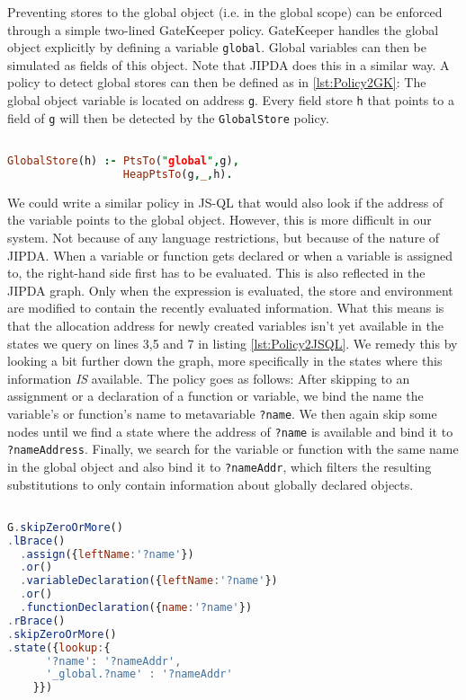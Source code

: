 Preventing stores to the global object (i.e. in the global scope) can be enforced through a simple two-lined GateKeeper policy. GateKeeper handles the global object explicitly by defining a variable \texttt{global}. Global variables can then be simulated as fields of this object. Note that JIPDA does this in a similar way. A policy to detect global stores can then be defined as in \ref{lst:Policy2GK}: The global object variable is located on address \texttt{g}. Every field store \texttt{h} that points to a field of \texttt{g} will then be detected by the \texttt{GlobalStore} policy.

\begin{lstlisting}[label={lst:Policy2GK},language=Prolog,caption=Policy 2 in GateKeeper,mathescape=true]  % float=t?

GlobalStore(h) :- PtsTo("global",g),
                  HeapPtsTo(g,_,h).
\end{lstlisting}

We could write a similar policy in JS-QL that would also look if the address of the variable points to the global object. However, this is more difficult in our system. Not because of any language restrictions, but because of the nature of JIPDA. When a variable or function gets declared or when a variable is assigned to, the right-hand side first has to be evaluated. This is also reflected in the JIPDA graph. Only when the expression is evaluated, the store and environment are modified to contain the recently evaluated information. What this means is that the allocation address for newly created variables isn't yet available in the states we query on lines 3,5 and 7 in listing \ref{lst:Policy2JSQL}. We remedy this by looking a bit further down the graph, more specifically in the states where this information \textit{IS} available. The policy goes as follows: After skipping to an assignment or a declaration of a function or variable, we bind the name the variable's or function's name to metavariable \texttt{?name}. We then again skip some nodes until we find a state where the address of \texttt{?name} is available and bind it to \texttt{?nameAddress}. Finally, we search for the variable or function with the same name in the global object and also bind it to \texttt{?nameAddr}, which filters the resulting substitutions to only contain information about globally declared objects.

\begin{lstlisting}[label={lst:Policy2JSQL},language=JavaScript,caption=Policy 2 in JS-QL,mathescape=true]  % float=t?

G.skipZeroOrMore()
.lBrace()
  .assign({leftName:'?name'})
  .or()
  .variableDeclaration({leftName:'?name'})
  .or()
  .functionDeclaration({name:'?name'})
.rBrace()
.skipZeroOrMore()
.state({lookup:{
      '?name': '?nameAddr',
      '_global.?name' : '?nameAddr'
    }})
\end{lstlisting}

